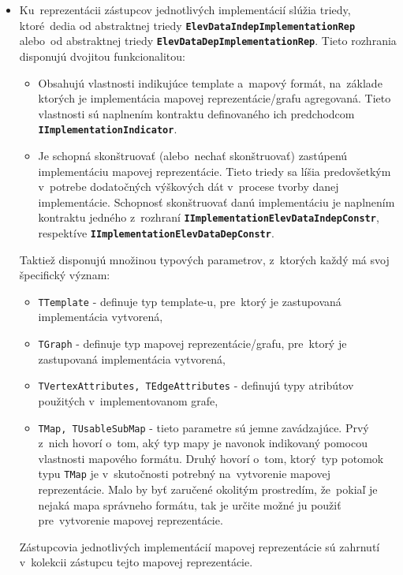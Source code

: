 \begin{itemize}
    \item Ku~reprezentácii zástupcov jednotlivých implementácií slúžia triedy, ktoré~dedia od abstraktnej triedy \textbf{\texttt{ElevDataIndepImplementationRep}} alebo~od abstraktnej triedy \textbf{\texttt{ElevDataDepImplementationRep}}. Tieto rozhrania disponujú dvojitou funkcionalitou:
    \begin{itemize}
        \item Obsahujú vlastnosti indikujúce template a~mapový formát, na~základe ktorých je implementácia mapovej reprezentácie/grafu agregovaná. Tieto vlastnosti sú naplnením kontraktu definovaného ich predchodcom \textbf{\texttt{IImplementationIndicator}}.
        \item Je schopná skonštruovať (alebo~nechať skonštruovať) zastúpenú implementáciu mapovej reprezentácie. Tieto triedy sa líšia predovšetkým v~potrebe dodatočných výškových dát v~procese tvorby danej implementácie. Schopnosť skonštruovať danú implementáciu je naplnením kontraktu jedného z~rozhraní \textbf{\texttt{IImplementationElevDataIndepConstr}}, respektíve \textbf{\texttt{IImplementationElevDataDepConstr}}. 
    \end{itemize}
    Taktiež disponujú množinou typových parametrov, z~ktorých každý má svoj špecifický význam:
    \begin{itemize}
        \item \texttt{TTemplate} - definuje typ template-u, pre~ktorý je zastupovaná implementácia vytvorená,
        \item \texttt{TGraph} - definuje typ mapovej reprezentácie/grafu, pre~ktorý je zastupovaná implementácia vytvorená,
        \item \texttt{TVertexAttributes, TEdgeAttributes} - definujú typy atribútov použitých v~implementovanom grafe,
        \item \texttt{TMap, TUsableSubMap} - tieto parametre sú jemne zavádzajúce. Prvý z~nich hovorí o~tom, aký typ mapy je navonok indikovaný pomocou vlastnosti mapového formátu. Druhý hovorí o~tom, ktorý~typ potomok typu \texttt{TMap} je v~skutočnosti potrebný na~vytvorenie mapovej reprezentácie. Malo by byť zaručené okolitým prostredím, že~pokiaľ je nejaká mapa správneho formátu, tak je určite možné ju použiť pre~vytvorenie mapovej reprezentácie. 
    \end{itemize}
    
    Zástupcovia jednotlivých implementácií mapovej reprezentácie sú zahrnutí v~kolekcii zástupcu tejto mapovej reprezentácie.

\end{itemize}

